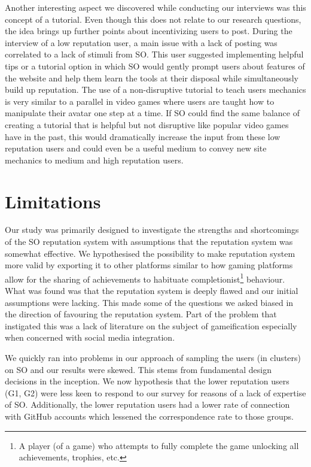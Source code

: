 \documentclass{sigchi}
\begin{document}
Another interesting aspect we discovered while conducting our interviews was this concept of a tutorial. Even though this does not relate to our research questions, the idea brings up further points about incentivizing users to post. During the interview of a low reputation user, a main issue with a lack of posting was correlated to a lack of stimuli from SO. This user suggested implementing helpful tips or a tutorial option in which SO would gently prompt users about features of the website and help them learn the tools at their disposal while simultaneously build up reputation. The use of a non-disruptive tutorial to teach users mechanics is very similar to a parallel in video games where users are taught how to manipulate their avatar one step at a time. If SO could find the same balance of creating a tutorial that is helpful but not disruptive like popular video games have in the past, this would dramatically increase the input from these low reputation users and could even be a useful medium to convey new site mechanics to medium and high reputation users.


\section{Limitations}

Our study was primarily designed to investigate the strengths and shortcomings of the SO reputation system with assumptions that the reputation system was somewhat effective. We hypothesised the possibility to make reputation system more valid by exporting it to other platforms similar to how gaming platforms allow for the sharing of achievements to habituate completionist\footnote{A player (of a game) who attempts to fully complete the game unlocking all achievements, trophies, etc.} behaviour. What was found was that the reputation system is deeply flawed and our initial assumptions were lacking. This made some of the questions we asked biased in the direction of favouring the reputation system. Part of the problem that instigated this was a lack of literature on the subject of gameification especially when concerned with social media integration.

We quickly ran into problems in our approach of sampling the users (in clusters) on SO and our results were skewed. This stems from fundamental design decisions in the inception. We now hypothesis that the lower reputation users (G1, G2) were less keen to respond to our survey for reasons of a lack of expertise of SO. Additionally, the lower reputation users had a lower rate of connection with GitHub accounts which lessened the correspondence rate to those groups.
\end{document}
